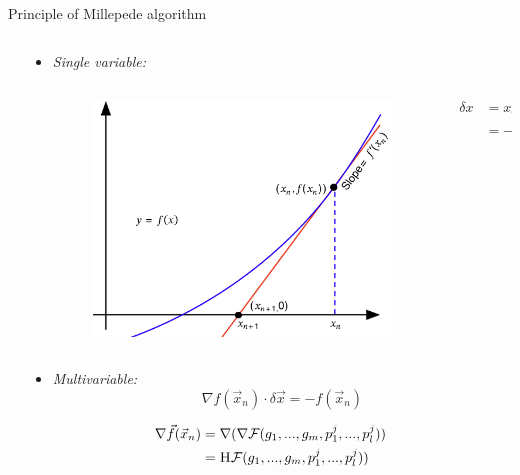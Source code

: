 \documentclass{ikpKoeln}
\begin{document}
\begin{frame}[t]{Principle of Millepede algorithm}
\begin{columns}[t]
\begin{column}{0.45 \textwidth}
{			\vspace*{-1em}
			}
		\end{column}
		\begin{column}{0.45 \textwidth}
			\onslide<2>
			\begin{itemize}
				\setlength{\itemindent}{-1em}
				\item \textit{\small Single variable:}
				      \begin{columns}
					      \begin{column}{0.6\textwidth}
						      \begin{figure}
							      \includegraphics[width = \textwidth]{neulandMeeting/Newton_iteration.png}
						      \end{figure}
					      \end{column}
					      \begin{column}{0.4\textwidth}
						      \begin{align*}
							      \delta x & = x_{n+1} - x_n     \\
							               & = -f(x_n) / f'(x_n)
						      \end{align*}
					      \end{column}
				      \end{columns}
				\item \textit{\small Multivariable:}
				      \vspace*{-1em}
				      $$\nabla f(\vec{x}_n) \cdot \delta \vec{x} = -f(\vec{x}_n)$$
			\end{itemize}

			\vspace*{-1em}
			\begin{align*}
				\nabla \vec{f}(\vec{x}_n) & = \nabla(\nabla \mathcal{F}(g_1, ..., g_m, p^j_1, ..., p^j_l)) \\
				                          & = \textsc{H}\mathcal{F}(g_1, ..., g_m, p^j_1, ..., p^j_l))
			\end{align*}


\end{column}
\end{columns}
\end{frame}
\end{document}
